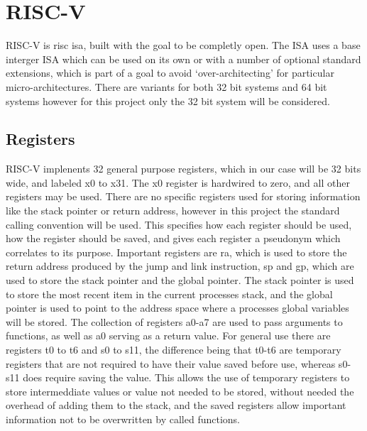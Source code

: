 \section{RISC-V}
RISC-V is \ac{risc} \ac{isa}, built with the goal to be completly open. The ISA uses a base interger ISA which can be used on its own or with a number of optional standard extensions, which is part of a goal to avoid `over-architecting' for particular micro-architectures. There are variants for both 32 bit systems and 64 bit systems however for this project only the 32 bit system will be considered.\cite{riscv_unpriv}
\subsection{Registers}
RISC-V implenents 32 general purpose registers, which in our case will be 32 bits wide, and labeled x0 to x31. The x0 register is hardwired to zero, and all other registers may be used. There are no specific registers used for storing information like the stack pointer or return address, however in this project the standard calling convention will be used. This specifies how each register should be used, how the register should be saved, and gives each register a pseudonym which correlates to its purpose. Important registers are ra, which is used to store the return address produced by the jump and link instruction, sp and gp, which are used to store the stack pointer and the global pointer. The stack pointer is used to store the most recent item in the current processes stack, and the global pointer is used to point to the address space where a processes global variables will be stored. The collection of registers a0-a7 are used to pass arguments to functions, as well as a0 serving as a return value. For general use there are registers t0 to t6 and s0 to s11, the difference being that t0-t6 are temporary registers that are not required to have their value saved before use, whereas s0-s11 does require saving the value. This allows the use of temporary registers to store intermeddiate values or value not needed to be stored, without needed the overhead of adding them to the stack, and the saved registers allow important information not to be overwritten by called functions.\cite{riscv_unpriv}
